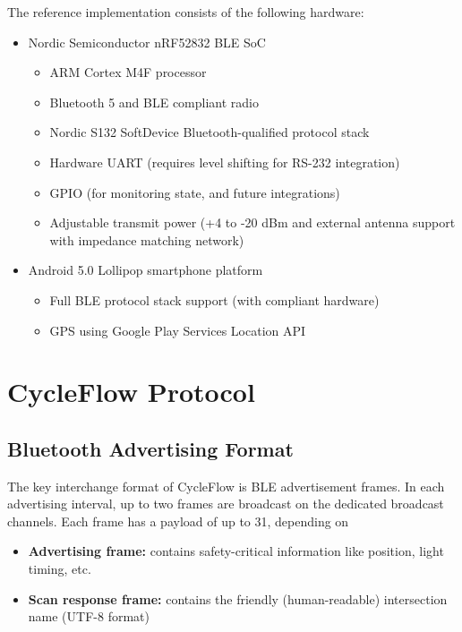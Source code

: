 \documentclass[12pt, oneside]{article}
\begin{document}
The reference implementation consists of the following hardware:
\begin{itemize}
\item Nordic Semiconductor nRF52832 BLE SoC
\begin{itemize}
\item ARM Cortex M4F processor
\item Bluetooth 5 and BLE compliant radio
\item Nordic S132 SoftDevice Bluetooth-qualified protocol stack
\item Hardware UART (requires level shifting for RS-232 integration)
\item GPIO (for monitoring state, and future integrations)
\item Adjustable transmit power (+4 to -20 dBm and external antenna support with impedance matching network)
\end{itemize}

\item Android 5.0 Lollipop smartphone platform
\begin{itemize}
\item Full BLE protocol stack support (with compliant hardware)
\item GPS using Google Play Services Location API
\end{itemize}
\end{itemize}


\section{CycleFlow Protocol}

\subsection{Bluetooth Advertising Format}
The key interchange format of CycleFlow is BLE advertisement frames. In each advertising interval, up to two frames are broadcast on the dedicated broadcast channels. Each frame has a payload of up to \SI{31}{\byte}, depending on 
\begin{itemize}
\item \textbf{Advertising frame:} contains safety-critical information like position, light timing, etc.
\item \textbf{Scan response frame:} contains the friendly (human-readable) intersection name (UTF-8 format)
\end{itemize}
\end{document}

